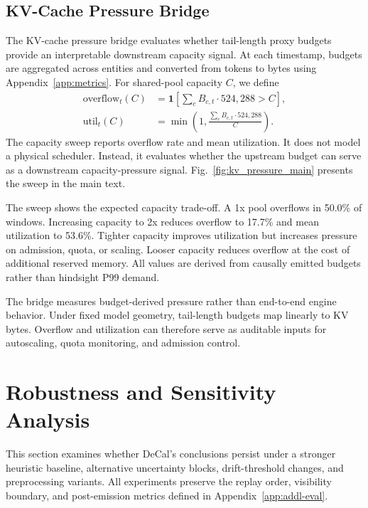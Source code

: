 \documentclass[sigplan,10pt, anonymous]{acmart}
\begin{document}
\subsection{KV-Cache Pressure Bridge}
\label{app:kv-bridge}

The KV-cache pressure bridge evaluates whether tail-length proxy budgets provide an interpretable downstream capacity signal. At each timestamp, budgets are aggregated across entities and converted from tokens to bytes using Appendix~\ref{app:metrics}. For shared-pool capacity $C$, we define
\begin{equation}
\label{eq:pool_pressure}
\begin{aligned}
\mathrm{overflow}_t(C)
&= \mathbf{1}\!\left[\sum_c B_{c,t}\cdot 524{,}288>C\right], \\
\mathrm{util}_t(C)
&= \min\!\left(1,\frac{\sum_c B_{c,t}\cdot 524{,}288}{C}\right).
\end{aligned}
\end{equation}
The capacity sweep reports overflow rate and mean utilization. It does not model a physical scheduler. Instead, it evaluates whether the upstream budget can serve as a downstream capacity-pressure signal. Fig.~\ref{fig:kv_pressure_main} presents the sweep in the main text.

The sweep shows the expected capacity trade-off. A 1x pool overflows in 50.0\% of windows. Increasing capacity to 2x reduces overflow to 17.7\% and mean utilization to 53.6\%. Tighter capacity improves utilization but increases pressure on admission, quota, or scaling. Looser capacity reduces overflow at the cost of additional reserved memory. All values are derived from causally emitted budgets rather than hindsight P99 demand.

The bridge measures budget-derived pressure rather than end-to-end engine behavior. Under fixed model geometry, tail-length budgets map linearly to KV bytes. Overflow and utilization can therefore serve as auditable inputs for autoscaling, quota monitoring, and admission control.

\section{Robustness and Sensitivity Analysis}
\label{app:stress_sensitivity}

This section examines whether DeCal's conclusions persist under a stronger heuristic baseline, alternative uncertainty blocks, drift-threshold changes, and preprocessing variants. All experiments preserve the replay order, visibility boundary, and post-emission metrics defined in Appendix~\ref{app:addl-eval}.
\end{document}
